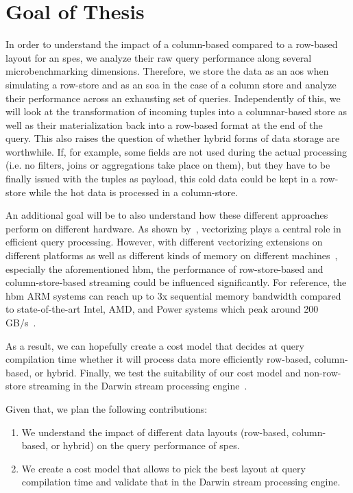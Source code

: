 \section{Goal of Thesis}
\label{sec:goal}

In order to understand the impact of a column-based compared to a row-based layout for an \acp{spe}, we analyze their raw query performance along several microbenchmarking dimensions.
Therefore, we store the data as an \ac{aos} when simulating a row-store and as an \ac{soa} in the case of a column store and analyze their performance across an exhausting set of queries.
Independently of this, we will look at the transformation of incoming tuples into a columnar-based store as well as their materialization back into a row-based format at the end of the query.
This also raises the question of whether hybrid forms of data storage are worthwhile.
If, for example, some fields are not used during the actual processing (i.e. no filters, joins or aggregations take place on them), but they have to be finally issued with the tuples as payload, this cold data could be kept in a row-store while the hot data is processed in a column-store.

An additional goal will be to also understand how these different approaches perform on different hardware.
As shown by~\citet{DBLP:journals/pvldb/KerstenLKNPB18}, vectorizing plays a central role in efficient query processing.
However, with different vectorizing extensions on different platforms as well as different kinds of memory on different machines~\cite[]{bollmeier2021processor}, especially the aforementioned \ac{hbm}, the performance of row-store-based and column-store-based streaming could be influenced significantly.
For reference, the \ac{hbm} ARM systems can reach up to 3x sequential memory bandwidth compared to state-of-the-art Intel, AMD, and Power systems which peak around 200 GB/s~\cite[]{bollmeier2021processor}.

As a  result, we can hopefully create a cost model that decides at query compilation time whether it will process data more efficiently row-based, column-based, or hybrid.
Finally, we test the suitability of our cost model and non-row-store streaming in the Darwin stream processing engine~\cite[]{DBLP:conf/cidr/BensonR22}.

Given that, we plan the following contributions:
\begin{enumerate}
    \item We understand the impact of different data layouts (row-based, column-based, or hybrid) on the query performance of \acp{spe}.
    \item We create a cost model that allows to pick the best layout at query compilation time and validate that in the Darwin stream processing engine.
\end{enumerate}